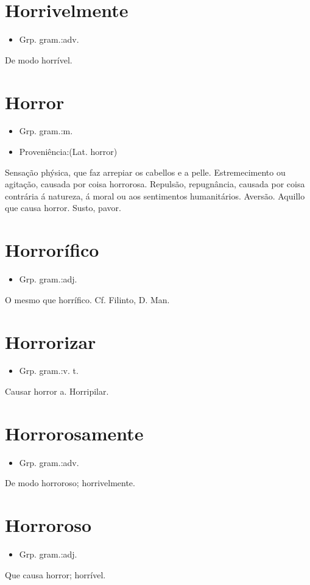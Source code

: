 \documentclass{article}
\begin{document}
\section{Horrivelmente}
\begin{itemize}
\item {Grp. gram.:adv.}
\end{itemize}
De modo horrível.
\section{Horror}
\begin{itemize}
\item {Grp. gram.:m.}
\end{itemize}
\begin{itemize}
\item {Proveniência:(Lat. \textunderscore horror\textunderscore )}
\end{itemize}
Sensação phýsica, que faz arrepiar os cabellos e a pelle.
Estremecimento ou agitação, causada por coisa horrorosa.
Repulsão, repugnância, causada por coisa contrária á natureza, á moral ou aos sentimentos humanitários.
Aversão.
Aquillo que causa horror.
Susto, pavor.
\section{Horrorífico}
\begin{itemize}
\item {Grp. gram.:adj.}
\end{itemize}
O mesmo que \textunderscore horrífico\textunderscore . Cf. Filinto, \textunderscore D. Man.\textunderscore 
\section{Horrorizar}
\begin{itemize}
\item {Grp. gram.:v. t.}
\end{itemize}
Causar horror a.
Horripilar.
\section{Horrorosamente}
\begin{itemize}
\item {Grp. gram.:adv.}
\end{itemize}
De modo horroroso; horrivelmente.
\section{Horroroso}
\begin{itemize}
\item {Grp. gram.:adj.}
\end{itemize}
Que causa horror; horrível.
\end{document}
